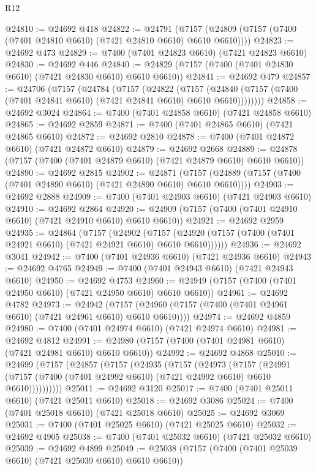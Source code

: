 \begin{lexlean}{R12}
\begin{coremodule}
{{{{{{{{{{{{{{{{{{{{{{{{{{{{{{{{{{{{{{{{{{{{{{{{{{{{{{{{{{{{{{{{{{{{{{{{{{{{{{{{{{@24810 := @24692 @418
@24822 := @24791
    (@7157 (@24809 (@7157 (@7400 (@7401 @24810 @6610) (@7421 @24810 @6610) @6610 @6610))))
@24823 := @24692 @473
@24829 := @7400 (@7401 @24823 @6610) (@7421 @24823 @6610)
@24830 := @24692 @446
@24840 := @24829 (@7157 (@7400 (@7401 @24830 @6610) (@7421 @24830 @6610) @6610 @6610))
@24841 := @24692 @479
@24857 := @24706
    (@7157
      (@24784
        (@7157
          (@24822
            (@7157
              (@24840 (@7157 (@7400 (@7401 @24841 @6610) (@7421 @24841 @6610) @6610 @6610))))))))
@24858 := @24692 @3024
@24864 := @7400 (@7401 @24858 @6610) (@7421 @24858 @6610)
@24865 := @24692 @2859
@24871 := @7400 (@7401 @24865 @6610) (@7421 @24865 @6610)
@24872 := @24692 @2810
@24878 := @7400 (@7401 @24872 @6610) (@7421 @24872 @6610)
@24879 := @24692 @2668
@24889 := @24878 (@7157 (@7400 (@7401 @24879 @6610) (@7421 @24879 @6610) @6610 @6610))
@24890 := @24692 @2815
@24902 := @24871
    (@7157 (@24889 (@7157 (@7400 (@7401 @24890 @6610) (@7421 @24890 @6610) @6610 @6610))))
@24903 := @24692 @2888
@24909 := @7400 (@7401 @24903 @6610) (@7421 @24903 @6610)
@24910 := @24692 @2864
@24920 := @24909 (@7157 (@7400 (@7401 @24910 @6610) (@7421 @24910 @6610) @6610 @6610))
@24921 := @24692 @2959
@24935 := @24864
    (@7157
      (@24902
        (@7157 (@24920 (@7157 (@7400 (@7401 @24921 @6610) (@7421 @24921 @6610) @6610 @6610))))))
@24936 := @24692 @3041
@24942 := @7400 (@7401 @24936 @6610) (@7421 @24936 @6610)
@24943 := @24692 @4765
@24949 := @7400 (@7401 @24943 @6610) (@7421 @24943 @6610)
@24950 := @24692 @4753
@24960 := @24949 (@7157 (@7400 (@7401 @24950 @6610) (@7421 @24950 @6610) @6610 @6610))
@24961 := @24692 @4782
@24973 := @24942
    (@7157 (@24960 (@7157 (@7400 (@7401 @24961 @6610) (@7421 @24961 @6610) @6610 @6610))))
@24974 := @24692 @4859
@24980 := @7400 (@7401 @24974 @6610) (@7421 @24974 @6610)
@24981 := @24692 @4812
@24991 := @24980 (@7157 (@7400 (@7401 @24981 @6610) (@7421 @24981 @6610) @6610 @6610))
@24992 := @24692 @4868
@25010 := @24699
    (@7157
      (@24857
        (@7157
          (@24935
            (@7157
              (@24973
                (@7157
                  (@24991
                    (@7157 (@7400 (@7401 @24992 @6610) (@7421 @24992 @6610) @6610 @6610))))))))))
@25011 := @24692 @3120
@25017 := @7400 (@7401 @25011 @6610) (@7421 @25011 @6610)
@25018 := @24692 @3086
@25024 := @7400 (@7401 @25018 @6610) (@7421 @25018 @6610)
@25025 := @24692 @3069
@25031 := @7400 (@7401 @25025 @6610) (@7421 @25025 @6610)
@25032 := @24692 @4905
@25038 := @7400 (@7401 @25032 @6610) (@7421 @25032 @6610)
@25039 := @24692 @4899
@25049 := @25038 (@7157 (@7400 (@7401 @25039 @6610) (@7421 @25039 @6610) @6610 @6610))
}}}}}}}}}}}}}}}}}}}}}}}}}}}}}}}}}}}}}}}}}}}}}}}}}}}}}}}}}}}}}}}}}}}}}}}}}}}}}}}}}}
\end{coremodule}
\end{lexlean}
